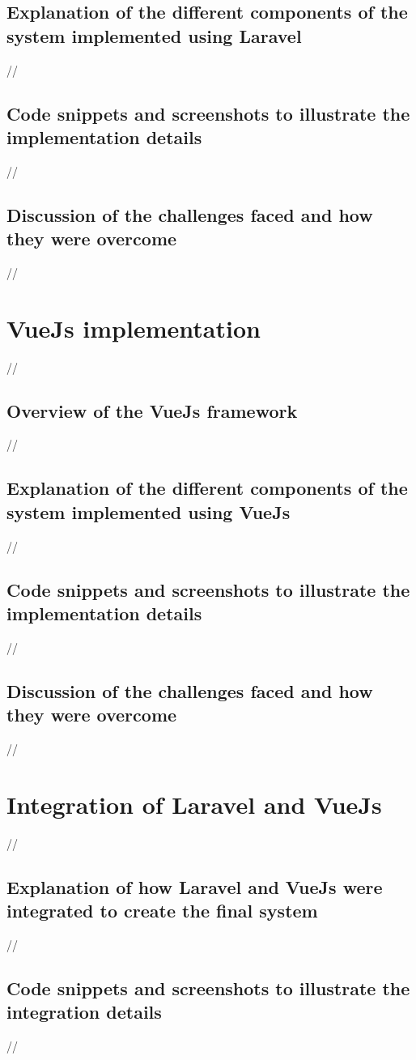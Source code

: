 \subsection {Explanation of the different components of the system implemented using Laravel}
//
\subsection {Code snippets and screenshots to illustrate the implementation details}
//
\subsection {Discussion of the challenges faced and how they were overcome}

//

\section {VueJs implementation}
//
\subsection {Overview of the VueJs framework}
//
\subsection {Explanation of the different components of the system implemented using VueJs}
//
\subsection {Code snippets and screenshots to illustrate the implementation details}
//
\subsection {Discussion of the challenges faced and how they were overcome}
//


\section {Integration of Laravel and VueJs}
//
\subsection {Explanation of how Laravel and VueJs were integrated to create the final system}
//
\subsection {Code snippets and screenshots to illustrate the integration details}
//
